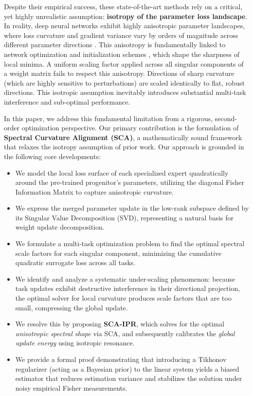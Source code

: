 \documentclass{article}
\theoremstyle{plain}
\theoremstyle{definition}
\theoremstyle{remark}
\begin{document}
Despite their empirical success, these state-of-the-art methods rely on a critical, yet highly unrealistic assumption: \textbf{isotropy of the parameter loss landscape}. 
In reality, deep neural networks exhibit highly anisotropic parameter landscapes, where loss curvature and gradient variance vary by orders of magnitude across different parameter directions \cite{choromanska2015loss, rahaman2019spectral, zhang2017understanding}. 
This anisotropy is fundamentally linked to network optimization and initialization schemes \cite{glorot2010understanding, he2015delving}, which shape the sharpness of local minima. 
A uniform scaling factor applied across all singular components of a weight matrix fails to respect this anisotropy. 
Directions of sharp curvature (which are highly sensitive to perturbations) are scaled identically to flat, robust directions. 
This isotropic assumption inevitably introduces substantial multi-task interference and sub-optimal performance.

In this paper, we address this fundamental limitation from a rigorous, second-order optimization perspective. 
Our primary contribution is the formulation of \textbf{Spectral Curvature Alignment (SCA)}, a mathematically sound framework that relaxes the isotropy assumption of prior work. 
Our approach is grounded in the following core developments:
\begin{itemize}
    \item We model the local loss surface of each specialized expert quadratically around the pre-trained progenitor's parameters, utilizing the diagonal Fisher Information Matrix to capture anisotropic curvature.
    \item We express the merged parameter update in the low-rank subspace defined by its Singular Value Decomposition (SVD), representing a natural basis for weight update decomposition.
    \item We formulate a multi-task optimization problem to find the optimal spectral scale factors for each singular component, minimizing the cumulative quadratic surrogate loss across all tasks.
    \item We identify and analyze a systematic under-scaling phenomenon: because task updates exhibit destructive interference in their directional projection, the optimal solver for local curvature produces scale factors that are too small, compressing the global update.
    \item We resolve this by proposing \textbf{SCA-IPR}, which solves for the optimal \textit{anisotropic spectral shape} via SCA, and subsequently calibrates the \textit{global update energy} using isotropic resonance.
    \item We provide a formal proof demonstrating that introducing a Tikhonov regularizer (acting as a Bayesian prior) to the linear system yields a biased estimator that reduces estimation variance and stabilizes the solution under noisy empirical Fisher measurements.
\end{itemize}
\end{document}
